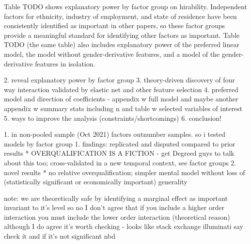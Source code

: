 \documentclass[review]{elsarticle}
\begin{document}
Table TODO shows explanatory power by factor group on hirability.
Independent factors for ethnicity, industry of employment, and state of residence
have been consistently identified as important in other papers,
so these factor groups provide a meaningful standard for identifying other factors as important.
Table TODO (the same table) also includes explanatory power of the preferred linear model,
the model without gender-derivative features,
and a model of the gender-derivative features in isolation.



2. reveal explanatory power by factor group
3. theory-driven discovery of four way interaction validated by elastic net and other feature selection
4. preferred model and direction of coefficients - appendix w full model and maybe another appendix w summary stats including n and table w selected variables of interest
5. ways to improve the analysis (constraints/shortcomings)
6. conclusion!



1. in non-pooled sample (Oct 2021) factors outnumber samples. so i tested models by factor group
1. findings: replicated and disputed compared to prior results
    * OVERQUALIFICATION IS A FICTION - get Degreed guys to talk about this too; cross-validated in a new temporal context, see factor groups
2. novel results
    * no relative overqualification; simpler mental model without loss of (statistically significant or economically important) generality

note: we are theoretically safe by identifying a marginal effect as important invariant to it's level
    so no I don't agree that if you include a higher order interaction you must include the lower order interaction (theoretical reason)
    although I do agree it's worth checking - looks like stack exchange illuminati say check it and if it's not significant nbd
\end{document}
